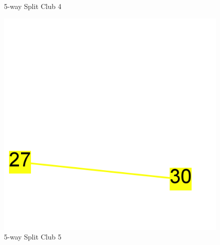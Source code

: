 \documentclass[paper=a4, fontsize=11pt]{scrartcl} %
\numberwithin{equation}{section} %
\numberwithin{figure}{section} %
\numberwithin{table}{section} %
\begin{document}
\begin{figure}[H]
\begin{minipage}{.4\textwidth}
\caption{5-way Split Club 4}
\label{fig:5clubs4}
\end{minipage}%
\begin{minipage}{.25\textwidth}
  \centering
\includegraphics[width=1\textwidth]{5clubs/club5}
\caption{5-way Split Club 5}
\label{fig:3clubs3}
\end{minipage}
\end{figure}

\newpage

{}

\end{document}
